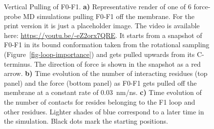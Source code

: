 \documentclass[
  twocolumn]{biophys-new-mod}
\begin{document}
\begin{figure}
\begin{minipage}[t]{\linewidth}
{{}

}

\subcaption{\label{fig-f0f1-vert-pull-force}~}
\end{minipage}%
\newline
\begin{minipage}[t]{\linewidth}

{\centering 


}

\subcaption{\label{fig-f0f1-vert-pull-contacts}~}
\end{minipage}%

\caption{\label{fig-f0f1-vert-pull}Vertical Pulling of F0-F1.
\textbf{a)} Representative render of one of 6 force-probe MD simulations
pulling F0-F1 off the membrane. For the print version it is just a
placeholder image. The video is available here:
\url{https://youtu.be/-eZ2orx7QRE}. It starts from a snapshot of F0-F1
in its bound conformation taken from the rotational sampling
(Figure~\ref{fig-loop-importance}) and gets pulled upwards from its
C-terminus. The direction of force is shown in the snapshot as a red
arrow. \textbf{b)} Time evolution of the number of interacting residues
(top panel) and the force (bottom panel) as F0-F1 gets pulled off the
membrane at a constant rate of 0.03~nm/ns. \textbf{c)} Time evolution of
the number of contacts for resides belonging to the F1 loop and other
residues. Lighter shades of blue correspond to a later time in the
simulation. Black dots mark the starting positions.}

\end{figure}
\end{document}
